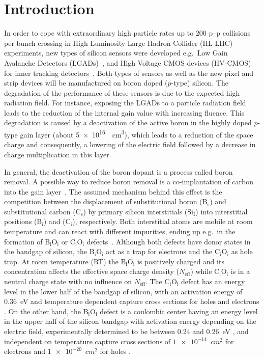 \documentclass[final, 5p, times]{elsarticle}
\begin{document}
\section{Introduction}
In order to cope with extraordinary high particle rates up to 200 p--p collisions per bunch crossing in High Luminosity Large Hadron Collider (HL-LHC) experiments, new types of silicon sensors were developed e.g.\ Low Gain Avalanche Detectors (LGADs)~\cite{b1,b2,b3}, and High Voltage CMOS devices (HV-CMOS) for inner tracking detectors~\cite{b4,b5,b6,b7,b8}. Both types of sensors as well as the new pixel and strip devices will be manufactured on boron doped ($p$-type) silicon. The degradation of the performance of these sensors is due to the expected high radiation field. For instance, exposing the LGADs to a particle radiation field leads to the reduction of the internal gain value with increasing fluence. This degradation is caused by a deactivation of the active boron in the highly doped $p$-type gain layer (about \SI{5e16}{\per\cubic\centi\meter}), which leads to a reduction of the space charge and consequently, a lowering of the electric field followed by a decrease in charge multiplication in this layer. 
\par
In general, the deactivation of the boron dopant is a process called boron removal. A possible way to reduce boron removal is a co-implantation of carbon into the gain layer~\cite{b2}. The assumed mechanism behind this effect is the competition between the displacement of substitutional boron (B$_\text{s}$) and substitutional carbon (C$_\text{s}$) by primary silicon interstitials (Si$_\text{I}$) into interstitial positions (B$_\text{i}$) and (C$_\text{i}$), respectively. Both interstitial atoms are mobile at room temperature and can react with different impurities, ending up e.g.\ in the formation of B$_\text{i}$O$_\text{i}$ or C$_\text{i}$O$_\text{i}$ defects~\cite{b30, b9, b10, b33, b27, b36}. Although both defects have donor states in the bandgap of silicon, the B$_\text{i}$O$_\text{i}$ act as a trap for electrons and the C$_\text{i}$O$_\text{i}$ as hole trap. At room temperature (RT) the B$_\text{i}$O$_\text{i}$ is positively charged and its concentration affects the effective space charge density ($N_\text{eff}$) while C$_\text{i}$O$_\text{i}$ is in a neutral charge state with no influence on $N_\text{eff}$. The C$_\text{i}$O$_\text{i}$ defect has an energy level in the lower half of the bandgap of silicon, with an activation energy of 0.36~eV and temperature dependent capture cross sections for holes and electrons \cite{b36}. On the other hand, the B$_\text{i}$O$_\text{i}$ defect is a coulombic center having an energy level in the upper half of the silicon bandgap with activation energy  depending on the electric field, experimentally determined to be between 0.24 and 0.26~eV \cite{b27}, and independent on temperature capture cross sections of $\num{1e-14}$~$\si{cm^{2}}$ for electrons  and $\num{1e-20}$~$\si{cm^{2}}$ for holes \cite{b30,b33}.
\end{document}
